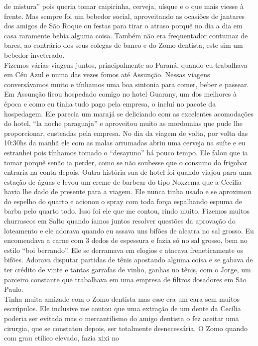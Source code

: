 \documentclass[12pt,brazil,]{book}
\begin{document}
de mistura'' pois queria tomar caipirinha, cerveja, uísque e o que mais
viesse à frente. Mas sempre foi um bebedor social, aproveitando as
ocasiões de jantares dos amigos de São Roque ou festas para tirar o
atraso porquê no dia a dia em casa raramente bebia alguma coisa. Também
não era frequentador contumaz de bares, ao contrário dos seus colegas de
banco e do Zomo dentista, este sim um bebedor inveterado.\\
Fizemos várias viagens juntos, principalmente ao Paraná, quando eu
trabalhava em Céu Azul e numa das vezes fomos até Assunção. Nessas
viagens conversávamos muito e tínhamos uma boa sintonia para comer,
beber e passear. Em Assunção ficou hospedado comigo no hotel Guarany, um
dos melhores à época e como eu tinha tudo pago pela empresa, o incluí no
pacote da hospedagem. Ele parecia um marajá se deliciando com as
excelentes acomodações do hotel, ``la noche paraguaja'' e aproveitou
muito as mordomias que pude lhe proporcionar, custeadas pela empresa. No
dia da viagem de volta, por volta das 10:30hs da manhã ele com as malas
arrumadas abriu uma cerveja na suíte e eu estranhei pois tínhamos tomado
o ``desayuno'' há pouco tempo. Ele falou que ia tomar porquê senão ia
perder, como se não soubesse que o consumo do frigobar entraria na conta
depois. Outra história sua de hotel foi quando viajou para uma estação
de águas e levou um creme de barbear do tipo Noxzema que a Cecilia havia
lhe dado de presente para a viagem. Ele nunca tinha usado e se aproximou
do espelho do quarto e acionou o spray com toda força espalhando espuma
de barba pelo quarto todo. Isso foi ele que me contou, rindo muito.
Fizemos muitos churrascos em Salto quando íamos juntos resolver questões
da aprovação do loteamento e ele adorava quando eu assava uns bifões de
alcatra no sal grosso. Eu encomendava a carne com 3 dedos de espessura e
fazia só no sal grosso, bem no estilo ``boi berrando''. Ele se derramava
em elogios e atacava freneticamente os bifões. Adorava disputar partidas
de tênis apostando alguma coisa e se gabava de ter crédito de vinte e
tantas garrafas de vinho, ganhas no tênis, com o Jorge, um parceiro
constante que trabalhava em uma empresa de filtros dosadores em São
Paulo.\\
Tinha muita amizade com o Zomo dentista mas esse era um cara sem muitos
escrúpulos. Ele inclusive me contou que uma extração de um dente da
Cecília poderia ser evitada mas o mercantilismo do amigo dentista o fez
aceitar uma cirurgia, que se constatou depois, ser totalmente
desnecessária. O Zomo quando com grau etílico elevado, fazia xixi no
\end{document}
